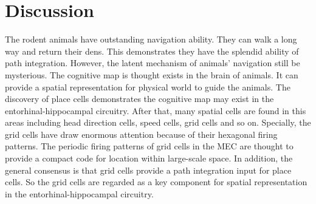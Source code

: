 \documentclass[final,5p,times,twocolumn,authoryear]{elsarticle}
\begin{document}
\section{Discussion}
The rodent animals have outstanding navigation ability\citep{Ball2013}. They can walk a long way and return their dens. This demonstrates they have the splendid ability of path integration. However, the latent mechanism of animals' navigation still be mysterious. The cognitive map is thought exists in the brain of animals\citep{Tolman1948}. It can provide a spatial representation for physical world to guide the animals. The discovery of place cells demonstrates the cognitive map may exist in the entorhinal-hippocampal circuitry\citep{OKeefe1978}. After that, many spatial cells are found in this areas including head direction cells, speed cells, grid cells and so on. Specially, the grid cells have draw enormous attention because of their hexagonal firing patterns. The periodic firing patterns of grid cells in the MEC are thought to provide a compact code for location within large-scale space\citep{Bush2015}. In addition, the general consensus is that grid cells provide a path integration input for place cells\citep{McNaughton2006}. So the grid cells are regarded as a key component for spatial representation in the entorhinal-hippocampal circuitry.
\end{document}
